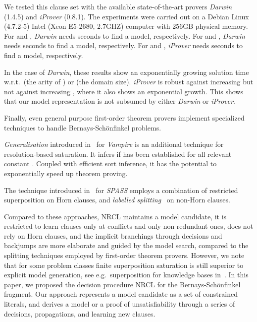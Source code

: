 \documentclass[a4paper]{article}
\newcommand{\mEPR}{Bernays-Sch\"onfinkel}
\newcommand{\eg}{e.g.\ }
\newcommand{\wrt}{w.r.t.\ }
\begin{document}
{We tested this clause set with the available state-of-the-art provers \emph{Darwin}
(1.4.5) and \emph{iProver} (0.8.1).
The experiments were carried out on a Debian Linux
(4.7.2-5) Intel (Xeon E5-2680, 2.7GHZ) computer with 256GB physical memory.
For  and , \emph{Darwin} needs  seconds to find a model, respectively.
For  and , \emph{Darwin} needs  seconds to find a model, respectively.
For  and , \emph{iProver} needs  seconds to find a model, 
respectively.

In the case of \emph{Darwin}, these results show an exponentially 
growing solution time \wrt  (the arity of ) or   (the domain size). 
\emph{iProver} is robust against increasing  but not against increasing
, where it also shows an exponential growth. 
 This shows that our model representation is not subsumed by either \emph{Darwin} or \emph{iProver}.


Finally, even general purpose first-order theorem provers implement specialized techniques to handle {\mEPR} problems.

\emph{Generalisation} introduced in~\cite{Generalization08} for \emph{Vampire} 
is an additional technique for resolution-based saturation. 
It infers  if  has been established for all relevant constant .
Coupled with efficient sort inference, it has the potential to exponentially speed up theorem proving.

The technique introduced in~\cite{HillenbrandWeidenbach13} for \emph{SPASS} employs 
a combination of restricted superposition on Horn clauses, and \emph{labelled splitting}~\cite{FietzkeW09} on non-Horn clauses.

Compared to these approaches, NRCL maintains a model candidate, it is restricted to learn clauses only at conflicts and only non-redundant ones, 
does not rely on Horn clauses, and the implicit branchings through decisions and backjumps are more elaborate and guided by the model search,
compared to the splitting techniques employed by first-order theorem provers.
However, we note that for some problem classes finite superposition saturation is still
superior to explicit model generation, see \eg superposition for knowledge bases in~\cite{SudaWeidenbachWischnewskiIJCAR10}.
In this paper, we proposed the decision procedure NRCL for the {\mEPR}
fragment. 
Our approach represents a model candidate as a set of constrained literals, and 
derives a model or a proof of unsatisfiability through a series of decisions, 
propagations, and learning new clauses. 

}
\end{document}
